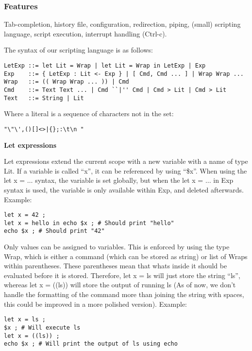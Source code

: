 \documentclass[11pt,a4paper]{article}
\begin{document}
\subsubsection{Features}
Tab-completion, history file, configuration, redirection, piping, (small)
scripting language, script execution, interrupt handling (Ctrl-c).

The syntax of our scripting language is as follows:

\begin{verbatim}
LetExp ::= let Lit = Wrap | let Lit = Wrap in LetExp | Exp
Exp    ::= { LetExp : Lit <- Exp } | [ Cmd, Cmd ... ] | Wrap Wrap ...
Wrap   ::= (( Wrap Wrap ... )) | Cmd
Cmd    ::= Text Text ... | Cmd ``|'' Cmd | Cmd > Lit | Cmd > Lit
Text   ::= String | Lit
\end{verbatim}

Where a literal is a sequence of characters not in the set:
\begin{verbatim}
"\"\',()[]<>|{};:\t\n "
\end{verbatim}

\textbf{Let expressions}

Let expressions extend the current scope with a new variable with a name of
type Lit. If a variable is called ``x'', it can be referenced by using ``\$x''.
When using the let x = $\dots$ syntax, the variable is set globally, but when
the let x = $\dots$ in Exp syntax is used, the variable is only available
within Exp, and deleted afterwards. Example:

\begin{verbatim}
let x = 42 ;
let x = hello in echo $x ; # Should print "hello"
echo $x ; # Should print "42"
\end{verbatim}

Only values can be assigned to variables. This is enforced by using the type
Wrap, which is either a command (which can be stored as string) or list of
Wraps within parentheses. These parentheses mean that whats inside it should be
evaluated before it is stored. Therefore, let x = ls will just store the string
``ls'', whereas let x = ((ls)) will store the output of running ls (As of now,
we don't handle the formatting of the command more than joining the string with
spaces, this could be improved in a more polished version). Example:

\begin{verbatim}
let x = ls ;
$x ; # Will execute ls
let x = ((ls)) ;
echo $x ; # Will print the output of ls using echo
\end{verbatim}
\end{document}
